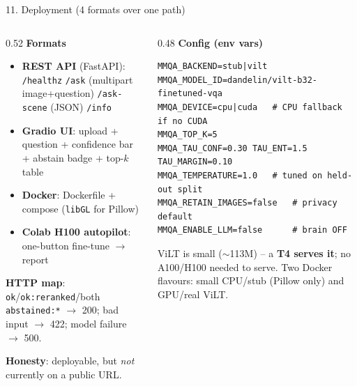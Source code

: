 \documentclass[10pt,aspectratio=169]{beamer}
\begin{document}
\begin{frame}[fragile]{11. Deployment (4 formats over one path)}
\begin{columns}[T]
\begin{column}{0.52\textwidth}
\textbf{Formats}
\begin{itemize}\scriptsize
  \item \textbf{REST API} (FastAPI): \texttt{/healthz} \texttt{/ask} (multipart image+question) \texttt{/ask-scene} (JSON) \texttt{/info}
  \item \textbf{Gradio UI}: upload + question + confidence bar + abstain badge + top-$k$ table
  \item \textbf{Docker}: Dockerfile + compose (\texttt{libGL} for Pillow)
  \item \textbf{Colab H100 autopilot}: one-button fine-tune $\to$ report
\end{itemize}
\scriptsize \textbf{HTTP map}: \texttt{ok}/\texttt{ok:reranked}/both \texttt{abstained:*} $\to$ 200; bad input $\to$ 422; model failure $\to$ 500.

\scriptsize \textbf{Honesty}: deployable, but \emph{not} currently on a public URL.
\end{column}
\begin{column}{0.48\textwidth}
\textbf{Config (env vars)}
\begin{lstlisting}[basicstyle=\ttfamily\tiny]
MMQA_BACKEND=stub|vilt
MMQA_MODEL_ID=dandelin/vilt-b32-finetuned-vqa
MMQA_DEVICE=cpu|cuda   # CPU fallback if no CUDA
MMQA_TOP_K=5
MMQA_TAU_CONF=0.30 TAU_ENT=1.5 TAU_MARGIN=0.10
MMQA_TEMPERATURE=1.0   # tuned on held-out split
MMQA_RETAIN_IMAGES=false   # privacy default
MMQA_ENABLE_LLM=false      # brain OFF
\end{lstlisting}
\scriptsize ViLT is small ($\sim$113M) -- a \textbf{T4 serves it}; no A100/H100 needed to serve. Two Docker flavours: small CPU/stub (Pillow only) and GPU/real ViLT.
\end{column}
\end{columns}
\end{frame}
\end{document}
